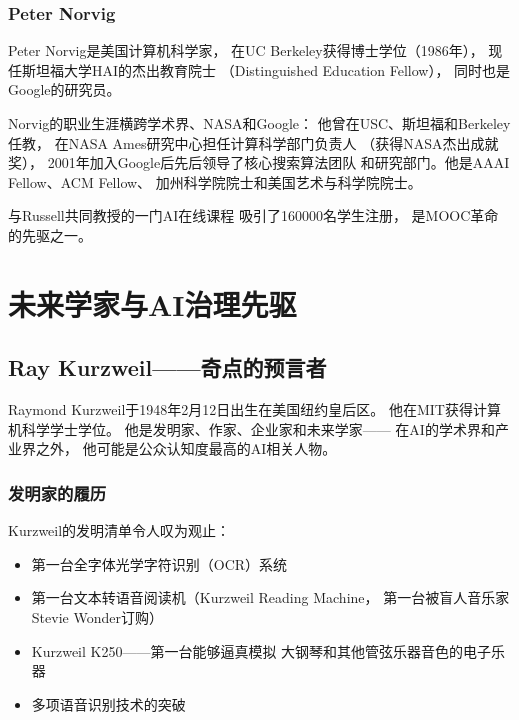 \subsubsection{Peter Norvig}
Peter Norvig是美国计算机科学家，
在UC Berkeley获得博士学位（1986年），
现任斯坦福大学HAI的杰出教育院士
（Distinguished Education Fellow），
同时也是Google的研究员。

Norvig的职业生涯横跨学术界、NASA和Google：
他曾在USC、斯坦福和Berkeley任教，
在NASA Ames研究中心担任计算科学部门负责人
（获得NASA杰出成就奖），
2001年加入Google后先后领导了核心搜索算法团队
和研究部门。他是AAAI Fellow、ACM Fellow、
加州科学院院士和美国艺术与科学院院士。

与Russell共同教授的一门AI在线课程
吸引了160000名学生注册，
是MOOC革命的先驱之一。


\section{未来学家与AI治理先驱}
\label{sec:futurists-governance}

\subsection{Ray Kurzweil——奇点的预言者}
\label{sec:kurzweil}

Raymond Kurzweil于1948年2月12日出生在美国纽约皇后区。
他在MIT获得计算机科学学士学位。
他是发明家、作家、企业家和未来学家——
在AI的学术界和产业界之外，
他可能是公众认知度最高的AI相关人物。

\subsubsection{发明家的履历}
Kurzweil的发明清单令人叹为观止：
\begin{itemize}[noitemsep]
  \item 第一台全字体光学字符识别（OCR）系统
  \item 第一台文本转语音阅读机（Kurzweil Reading Machine，
    第一台被盲人音乐家Stevie Wonder订购）
  \item Kurzweil K250——第一台能够逼真模拟
    大钢琴和其他管弦乐器音色的电子乐器
  \item 多项语音识别技术的突破
\end{itemize}


